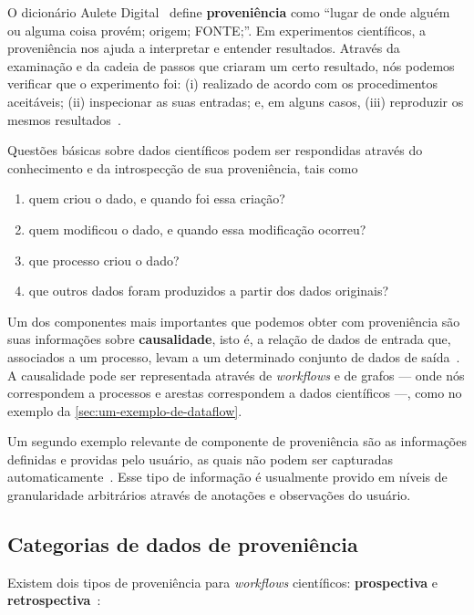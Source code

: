 O dicionário Aulete Digital~\cite{auletedigitalonline} define \textbf{proveniência} como
``lugar de onde alguém ou alguma coisa provém; origem; FONTE;''. Em experimentos científicos, a proveniência nos ajuda a interpretar e entender resultados. Através da examinação e da cadeia de passos que criaram um certo resultado, nós podemos verificar que o experimento foi: (i) realizado de acordo com os procedimentos aceitáveis; (ii) inspecionar as suas entradas; e, em alguns casos, (iii) reproduzir os mesmos resultados~\cite{freire2008provenance}.

Questões básicas sobre dados científicos podem ser respondidas através do conhecimento e da introspecção de sua proveniência, tais como

\begin{enumerate}
    \item quem criou o dado, e quando foi essa criação?
    \item quem modificou o dado, e quando essa modificação ocorreu?
    \item que processo criou o dado?
    \item que outros dados foram produzidos a partir dos dados originais?
\end{enumerate}

Um dos componentes mais importantes que podemos obter com proveniência são suas informações sobre \textbf{causalidade}, isto é, a relação de dados de entrada que, associados a um processo, levam a um determinado conjunto de dados de saída~\cite{freire2008provenance}. A causalidade pode ser representada através de \textit{workflows} e de grafos --- onde nós correspondem a processos e arestas correspondem a dados científicos ---, como no exemplo da \autoref{sec:um-exemplo-de-dataflow}.

Um segundo exemplo relevante de componente de proveniência são as informações definidas e providas pelo usuário, as quais não podem ser capturadas automaticamente~\cite{freire2008provenance}. Esse tipo de informação é usualmente provido em níveis de granularidade arbitrários através de anotações e observações do usuário.

\subsection{Categorias de dados de proveniência}

Existem dois tipos de proveniência para \textit{workflows} científicos: \textbf{prospectiva} e \textbf{retrospectiva}~\cite{murta2014noworkflow,freire2008provenance}:

